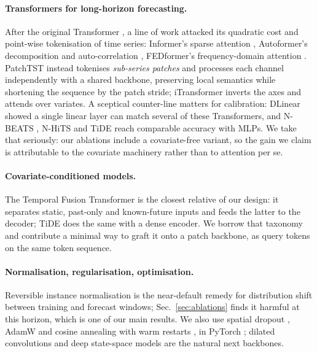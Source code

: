 \documentclass[10pt,twocolumn]{article}
\begin{document}
\paragraph{Transformers for long-horizon forecasting.} After the original
Transformer \cite{vaswani2017attention}, a line of work attacked its quadratic cost
and point-wise tokenisation of time series: Informer's sparse attention
\cite{zhou2021informer}, Autoformer's decomposition and auto-correlation
\cite{wu2021autoformer}, FEDformer's frequency-domain attention
\cite{zhou2022fedformer}. PatchTST \cite{nie2023patchtst} instead tokenises
\emph{sub-series patches} and processes each channel independently with a shared
backbone, preserving local semantics while shortening the sequence by the patch
stride; iTransformer \cite{liu2024itransformer} inverts the axes and attends over
variates. A sceptical counter-line matters for calibration: DLinear
\cite{zeng2023dlinear} showed a single linear layer can match several of these
Transformers, and N-BEATS \cite{oreshkin2020nbeats}, N-HiTS \cite{challu2023nhits}
and TiDE \cite{das2023tide} reach comparable accuracy with MLPs. We take that
seriously: our ablations include a covariate-free variant, so the gain we claim is
attributable to the covariate machinery rather than to attention per se.

\paragraph{Covariate-conditioned models.} The Temporal Fusion Transformer
\cite{lim2021tft} is the closest relative of our design: it separates static,
past-only and known-future inputs and feeds the latter to the decoder; TiDE
\cite{das2023tide} does the same with a dense encoder. We borrow that taxonomy and
contribute a minimal way to graft it onto a patch backbone, as query tokens on the
same token sequence.

\paragraph{Normalisation, regularisation, optimisation.} Reversible instance
normalisation \cite{kim2022revin} is the near-default remedy for distribution shift
between training and forecast windows; Sec.~\ref{sec:ablations} finds it harmful at
this horizon, which is one of our main results. We also use spatial dropout
\cite{tompson2015spatialdropout}, AdamW \cite{loshchilov2019adamw} and cosine
annealing with warm restarts \cite{loshchilov2017sgdr}, in PyTorch
\cite{paszke2019pytorch}; dilated convolutions \cite{bai2018tcn} and deep
state-space models \cite{gu2022s4,gu2024mamba} are the natural next backbones.
\end{document}
